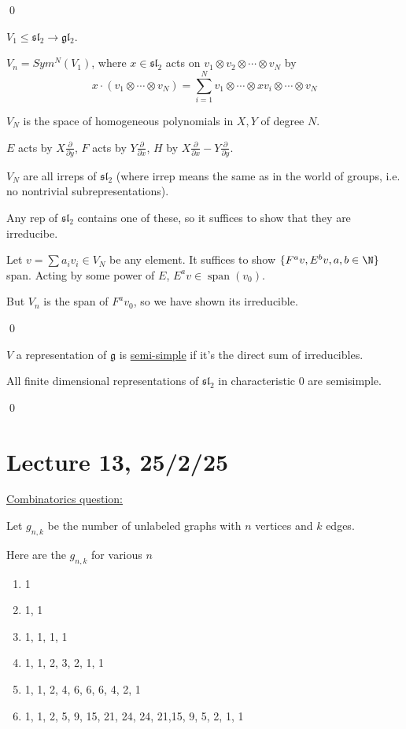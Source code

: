 \documentclass[x11names,reqno,14pt]{extarticle}
\newcommand{\mk}[1]{\mathfrak{#1}}
\newcommand{\g}{\mk{g}}
\newcommand{\pp}[2]{\frac{\partial #1}{\partial #2}}
\newcommand{\gl}{\mk{g}\mk{l}}
\renewcommand{\sl}{\mk{s}\mk{l}}
\DeclareMathOperator{\Span}{span}
\begin{document}
\proof

\qed

$V_1 \leq \sl_2 \to \gl_2$. 

$V_n = Sym^N(V_1)$, where $x \in \sl_2$ acts on $v_1\otimes v_2\otimes\cdots\otimes v_N$ by 
\[
x\cdot(v_1\otimes\cdots\otimes v_N) = \sum_{i=1}^Nv_1\otimes\cdots \otimes xv_i\otimes\cdots\otimes v_N
\]

$V_N$ is the space of homogeneous polynomials in $X, Y$ of degree $N$.

$E$ acts by $X\pp{}{y}$, $F$ acts by $Y\pp{}{x}$, $H$ by $X\pp{}{x} - Y\pp{}{y}$.

\claim

$V_N$ are all irreps of $\sl_2$ (where irrep means the same as in the world of groups, i.e. no nontrivial subrepresentations). 

\proof

Any rep of $\sl_2$ contains one of these, so it suffices to show that they are irreducibe. 

Let $v = \sum a_iv_i \in V_N$ be any element. It suffices to show $\{F^av, E^bv, a, b \in \N\}$ span. Acting by some power of $E$, $E^av \in \Span(v_0)$.

But $V_n$ is the span of $F^av_0$, so we have shown its irreducible. 

\qed


$V$ a representation of $\g$ is \underline{semi-simple} if it's the direct sum of irreducibles. 

\thm

All finite dimensional representations of $\sl_2$ in characteristic 0 are semisimple. 

\proof

\qed

\section*{Lecture 13, 25/2/25}

\underline{Combinatorics question:}

Let $g_{n,k}$ be the number of unlabeled graphs with $n$ vertices and $k$ edges. 

Here are the $g_{n,k}$ for various $n$ 
\begin{enumerate}

\item 1

\item 1, 1

\item 1, 1, 1, 1

\item 1, 1, 2, 3, 2, 1, 1 

\item 1, 1, 2, 4, 6, 6, 6, 4, 2, 1

\item 1, 1, 2, 5, 9, 15, 21, 24, 24, 21,15, 9, 5, 2, 1, 1

\end{enumerate}
\end{document}

